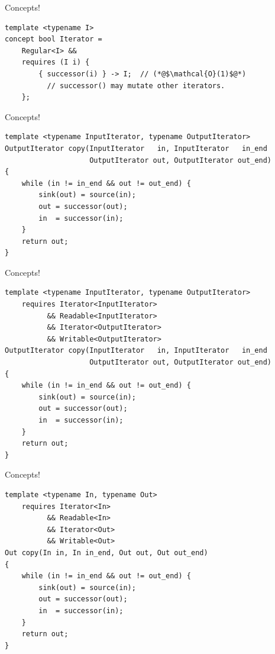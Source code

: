 \documentclass[aspectratio=169]{beamer}
\begin{document}

\begin{frame}[fragile]{Concepts!}
\begin{lstlisting}
template <typename I>
concept bool Iterator =
    Regular<I> &&
    requires (I i) {
        { successor(i) } -> I;  // (*@$\mathcal{O}(1)$@*)
          // successor() may mutate other iterators.
    };
\end{lstlisting}
\end{frame}


\begin{frame}[fragile]{Concepts!}
  \footnotesize
\begin{lstlisting}
template <typename InputIterator, typename OutputIterator>
OutputIterator copy(InputIterator   in, InputIterator   in_end
                    OutputIterator out, OutputIterator out_end)
{
    while (in != in_end && out != out_end) {
        sink(out) = source(in);
        out = successor(out);
        in  = successor(in);
    }
    return out;
}
\end{lstlisting}
\end{frame}


\begin{frame}[fragile]{Concepts!}
  \footnotesize
\begin{lstlisting}
template <typename InputIterator, typename OutputIterator>
    requires Iterator<InputIterator>
          && Readable<InputIterator>
          && Iterator<OutputIterator>
          && Writable<OutputIterator>
OutputIterator copy(InputIterator   in, InputIterator   in_end
                    OutputIterator out, OutputIterator out_end)
{
    while (in != in_end && out != out_end) {
        sink(out) = source(in);
        out = successor(out);
        in  = successor(in);
    }
    return out;
}
\end{lstlisting}
\end{frame}


\begin{frame}[fragile]{Concepts!}
  \footnotesize
\begin{lstlisting}
template <typename In, typename Out>
    requires Iterator<In>
          && Readable<In>
          && Iterator<Out>
          && Writable<Out>
Out copy(In in, In in_end, Out out, Out out_end)
{
    while (in != in_end && out != out_end) {
        sink(out) = source(in);
        out = successor(out);
        in  = successor(in);
    }
    return out;
}
\end{lstlisting}
\end{frame}
\end{document}
